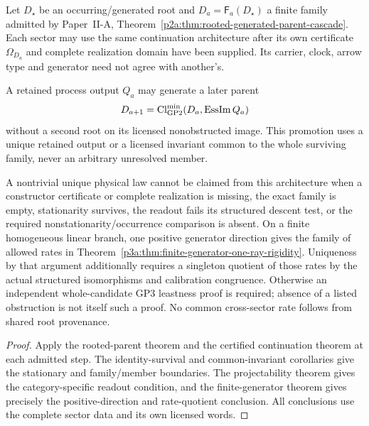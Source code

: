 \documentclass[12pt,a4paper]{article}
\begin{document}
\begin{corollary}
\label{p3a:cor:rooted-dynamical-parent-cascade}
Let \(D_\star\) be an occurring/generated root and
\(D_a=\mathsf F_a(D_\star)\) a finite family admitted by Paper~II-A,
Theorem~\ref{p2a:thm:rooted-generated-parent-cascade}. Each sector may
use the same continuation architecture after its own certificate
\(\Omega_{D_a}\) and complete realization domain have been supplied.
Its carrier, clock, arrow type and generator need not agree with another's.

A retained process output \(Q_a\) may generate a later parent
\[
 D_{a+1}=\operatorname{Cl}^{\min}_{\rm GP2}
       (D_a,\operatorname{EssIm}Q_a)
\]
without a second root on its licensed nonobstructed image. This promotion
uses a unique retained output or a licensed invariant common to the whole
surviving family, never an arbitrary unresolved member.

A nontrivial unique physical law cannot be claimed from this architecture
when a constructor certificate or complete realization is missing, the exact
family is empty, stationarity survives, the readout fails its structured
descent test, or the required nonstationarity/occurrence comparison is absent.
On a finite homogeneous linear branch, one positive generator direction gives
the family of allowed rates in
Theorem~\ref{p3a:thm:finite-generator-one-ray-rigidity}. Uniqueness by that
argument additionally requires a singleton quotient of those rates by the
actual structured isomorphisms and calibration congruence. Otherwise an
independent whole-candidate GP3 leastness proof is required; absence of a
listed obstruction is not itself such a proof. No common cross-sector rate
follows from shared root provenance.
\end{corollary}
\begin{proof}
Apply the rooted-parent theorem and the certified continuation theorem at
each admitted step. The identity-survival and common-invariant corollaries
give the stationary and family/member boundaries. The projectability theorem
gives the category-specific readout condition, and the finite-generator
theorem gives precisely the positive-direction and rate-quotient conclusion.
All conclusions use the complete sector data and its own licensed words.
\end{proof}
\end{document}
